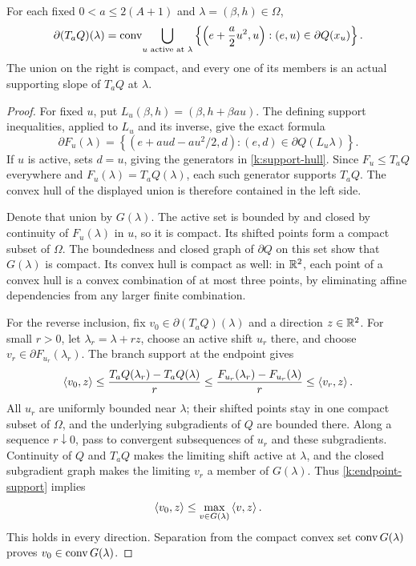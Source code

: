 \begin{proposition}
\label{k:subdifferential}
For each fixed $0<a\le2(A+1)$ and $\lambda=(\beta,h)\in\Omega$,
\begin{equation}
 \partial(T_aQ)(\lambda)
 =\operatorname{conv}\!\bigcup_{u\text{ active at }\lambda}
 \left\{\left(e+\frac a2u^2,u\right):(e,u)\in\partial Q(x_u)\right\}.
 \label{k:support-hull}
\end{equation}
The union on the right is compact, and every one of its members is an
actual supporting slope of $T_aQ$ at $\lambda$.
\end{proposition}

\begin{proof}
For fixed $u$, put $L_u(\beta,h)=(\beta,h+\beta au)$.  The defining
support inequalities, applied to $L_u$ and its inverse, give the exact
formula
\[
 \partial F_u(\lambda)=
 \left\{(e+aud-au^2/2,d):(e,d)\in\partial Q(L_u\lambda)\right\}.
\]
If $u$ is active,  sets $d=u$, giving the
generators in \eqref{k:support-hull}.  Since $F_u\le T_aQ$ everywhere
and $F_u(\lambda)=T_aQ(\lambda)$, each such generator supports $T_aQ$.
The convex hull of the displayed union is therefore contained in the
left side.

Denote that union by $G(\lambda)$.  The active set is bounded by
 and closed by continuity of $F_u(\lambda)$
in $u$, so it is compact.  Its shifted points form a compact subset of
$\Omega$.  The boundedness and closed graph of $\partial Q$ on this set
show that $G(\lambda)$ is compact.  Its convex hull is compact as well:
in $\mathbb R^2$, each point of a convex hull is a convex combination of at most
three points, by eliminating affine dependencies from any larger finite
combination.

For the reverse inclusion, fix $v_0\in\partial(T_aQ)(\lambda)$ and a
direction $z\in\mathbb R^2$.  For small $r>0$, let $\lambda_r=\lambda+rz$,
choose an active shift $u_r$ there, and choose
$v_r\in\partial F_{u_r}(\lambda_r)$.  The branch support at the endpoint
gives
\begin{equation}
 \left\langle v_0,z\right\rangle
 \le\frac{T_aQ(\lambda_r)-T_aQ(\lambda)}r
 \le\frac{F_{u_r}(\lambda_r)-F_{u_r}(\lambda)}r
 \le\left\langle v_r,z\right\rangle.
 \label{k:endpoint-support}
\end{equation}
All $u_r$ are uniformly bounded near $\lambda$; their shifted points
stay in one compact subset of $\Omega$, and the underlying subgradients
of $Q$ are bounded there.  Along a sequence $r\downarrow0$, pass to
convergent subsequences of $u_r$ and these subgradients.  Continuity of
$Q$ and $T_aQ$ makes the limiting shift active at $\lambda$, and the
closed subgradient graph makes the limiting $v_r$ a member of
$G(\lambda)$.  Thus \eqref{k:endpoint-support} implies
\[
 \left\langle v_0,z\right\rangle\le\max_{v\in G(\lambda)}\left\langle v,z\right\rangle.
\]
This holds in every direction.  Separation from the compact convex set
$\operatorname{conv} G(\lambda)$ proves $v_0\in\operatorname{conv} G(\lambda)$.
\end{proof}


